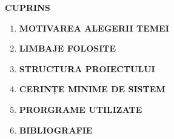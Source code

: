 
\begin{center}
	\huge
	\textbf{CUPRINS}
	\vspace{3cm}
\end{center}

\begin{enumerate}

	\large
	\item \textbf{MOTIVAREA ALEGERII TEMEI}
	\item \textbf{LIMBAJE FOLOSITE}
	\item \textbf{STRUCTURA PROIECTULUI}
	\item \textbf{CERINȚE MINIME DE SISTEM}
	\item \textbf{PRORGRAME UTILIZATE}
	\item \textbf{BIBLIOGRAFIE}

\end{enumerate}
